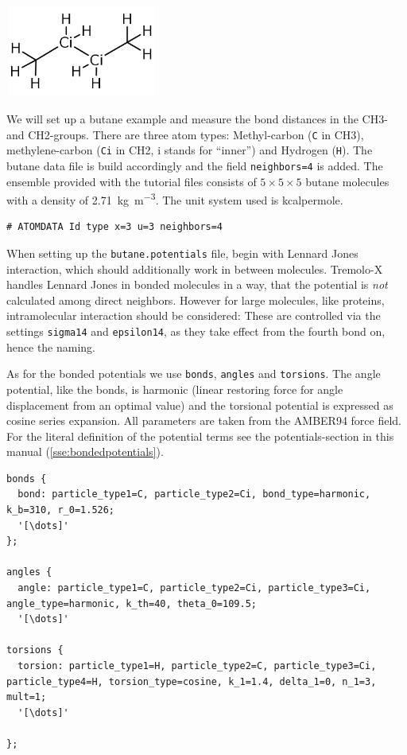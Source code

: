 \begin{center}
    \includegraphics[width=5cm, height=3cm]{visuals/butane} %
\end{center}

We will set up a butane example and measure the bond distances in the
CH3- and CH2-groups. There are three atom types: Methyl-carbon
(\texttt{C} in CH3), methylene-carbon (\texttt{Ci} in CH2, i stands for
``inner'') and Hydrogen (\texttt{H}). The butane data file is build
accordingly and the field \texttt{neighbors=4} is added. The ensemble
provided with the tutorial files consists of $5\times 5\times 5$ butane
molecules with a density of \SI{2.71}{\kilogram\per\cubic\meter}. The
unit system used is kcalpermole.

\begin{lstlisting}[caption=Header of the .data file]
# ATOMDATA Id type x=3 u=3 neighbors=4
\end{lstlisting}

When setting up the \texttt{butane.potentials} file, begin with Lennard
Jones interaction, which should additionally work in between molecules.
Tremolo-X handles Lennard Jones in bonded molecules in a way, that the
potential is \emph{not} calculated among direct neighbors. However for
large molecules, like proteins, intramolecular interaction should be
considered: These are controlled via the settings \texttt{sigma14} and
\texttt{epsilon14}, as they take effect from the fourth bond on, hence
the naming.

As for the bonded potentials we use \texttt{bonds}, \texttt{angles} and
\texttt{torsions}. The angle potential, like the bonds, is harmonic
(linear restoring force for angle displacement from an optimal value)
and the torsional potential is expressed as cosine series expansion. All
parameters are taken from the AMBER94 force field. For the literal
definition of the potential terms see the potentials-section in this
manual (\ref{sse:bondedpotentials}).

\begin{lstlisting}[escapechar=', caption=Excerpt from the
    .potentials file]
bonds {
  bond: particle_type1=C, particle_type2=Ci, bond_type=harmonic, k_b=310, r_0=1.526;
  '[\dots]'
};

angles {
  angle: particle_type1=C, particle_type2=Ci, particle_type3=Ci, angle_type=harmonic, k_th=40, theta_0=109.5;
  '[\dots]'

torsions {
  torsion: particle_type1=H, particle_type2=C, particle_type3=Ci, particle_type4=H, torsion_type=cosine, k_1=1.4, delta_1=0, n_1=3, mult=1;
  '[\dots]'

};
\end{lstlisting}

